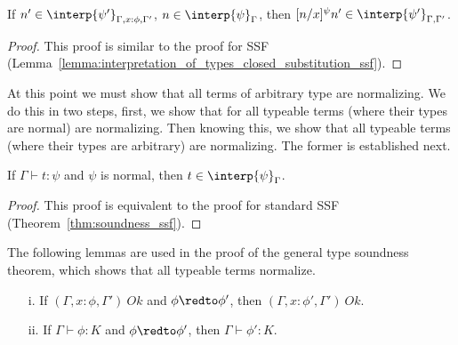 \begin{lemma}
  If $n' \in \interp{\psi'}_{\Gamma,x:\phi,\Gamma'}$, $n \in \interp{\psi}_\Gamma$, then 
  $[n/x]^\psi n' \in \interp{\psi'}_{\Gamma,\Gamma'}$.
  
  \label{lemma:interpretation_of_types_closed_substitution_stlc}
\end{lemma}
\begin{proof}
  This proof is similar to the proof for SSF
  (Lemma~\ref{lemma:interpretation_of_types_closed_substitution_ssf}).
\end{proof}
At this point we must show that all terms of arbitrary type are
normalizing. We do this in two steps, first, we show that for all
typeable terms (where their types are normal) are normalizing.  Then
knowing this, we show that all typeable terms (where their types are
arbitrary) are normalizing. The former is established next.
\begin{thm}
  If $\Gamma \vdash t:\psi$ and $\psi$ is normal, then $t \in \interp{\psi}_\Gamma$.
  \label{thm:soundness__normal_ssfw}
\end{thm}
\begin{proof}
  This proof is equivalent to the proof for standard SSF
  (Theorem~\ref{thm:soundness_ssf}).
\end{proof}
\noindent
The following lemmas are used in the proof of the general type
soundness theorem, which shows that all typeable terms normalize.
\begin{lemma}
  \label{lemma:preservation_for_kinding_ssfw}
  \begin{itemize}
  \item[i.] If $(\Gamma,x:\phi,\Gamma')\ Ok$ and $\phi \redto \phi'$, then $(\Gamma,x:\phi',\Gamma')\ Ok$.
  \item[ii.] If $\Gamma \vdash \phi:K$ and $\phi \redto \phi'$, then $\Gamma \vdash \phi':K$.
  \end{itemize}
\end{lemma}
